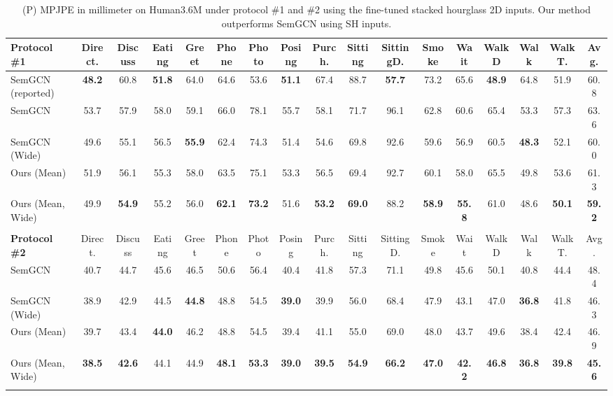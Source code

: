 \begin{table}
\scriptsize
\setlength{\tabcolsep}{1pt}
\begin{tabular}{lcccccccccccccccc}
\textbf{Protocol   \#1} & Direct. & Discuss & Eating & Greet & Phone & Photo & Posing & Purch. & Sitting & SittingD. & Smoke & Wait & WalkD & Walk & WalkT. & Avg. \\ \hline
SemGCN (reported)\cite{Zhao_2019_CVPR} & \textbf{48.2} & 60.8 & \textbf{51.8} & 64.0 & 64.6 & 53.6 & \textbf{51.1} & 67.4 & 88.7 & \textbf{57.7} & 73.2 & 65.6 & \textbf{48.9} & 64.8 & 51.9 & 60.8 \\
SemGCN & 53.7 & 57.9 & 58.0 & 59.1 & 66.0 & 78.1 & 55.7 & 58.1 & 71.7 & 96.1 & 62.8 & 60.6 & 65.4 & 53.3 & 57.3 & 63.6 \\
SemGCN (Wide) & 49.6 & 55.1 & 56.5 & \textbf{55.9} & 62.4 & 74.3 & 51.4 & 54.6 & 69.8 & 92.6 & 59.6 & 56.9 & 60.5 & \textbf{48.3} & 52.1 & 60.0 \\
Ours (Mean) & 51.9 & 56.1 & 55.3 & 58.0 & 63.5 & 75.1 & 53.3 & 56.5 & 69.4 & 92.7 & 60.1 & 58.0 & 65.5 & 49.8 & 53.6 & 61.3 \\
Ours (Mean, Wide) & 49.9 & \textbf{54.9} & 55.2 & 56.0 & \textbf{62.1} & \textbf{73.2} & 51.6 & \textbf{53.2} & \textbf{69.0} & 88.2 & \textbf{58.9} & \textbf{55.8} & 61.0 & 48.6 & \textbf{50.1} & \textbf{59.2} \\
 &  &  &  &  &  &  &  &  &  &  &  &  &  &  &  &  \\
\textbf{Protocol \#2} & Direct. & Discuss & Eating & Greet & Phone & Photo & Posing & Purch. & Sitting & SittingD. & Smoke & Wait & WalkD & Walk & WalkT. & Avg. \\ \hline
SemGCN & 40.7 & 44.7 & 45.6 & 46.5 & 50.6 & 56.4 & 40.4 & 41.8 & 57.3 & 71.1 & 49.8 & 45.6 & 50.1 & 40.8 & 44.4 & 48.4 \\
SemGCN (Wide) & 38.9 & 42.9 & 44.5 & \textbf{44.8} & 48.8 & 54.5 & \textbf{39.0} & 39.9 & 56.0 & 68.4 & 47.9 & 43.1 & 47.0 & \textbf{36.8} & 41.8 & 46.3 \\
Ours (Mean) & 39.7 & 43.4 & \textbf{44.0} & 46.2 & 48.8 & 54.5 & 39.4 & 41.1 & 55.0 & 69.0 & 48.0 & 43.7 & 49.6 & 38.4 & 42.4 & 46.9 \\
Ours (Mean, Wide) & \textbf{38.5} & \textbf{42.6} & 44.1 & 44.9 & \textbf{48.1} & \textbf{53.3} & \textbf{39.0} & \textbf{39.5} & \textbf{54.9} & \textbf{66.2} & \textbf{47.0} & \textbf{42.2} & \textbf{46.8} & \textbf{36.8} & \textbf{39.8} & \textbf{45.6} \\
 &  &  &  &  &  &  &  &  &  &  &  &  &  &  &  & 
\end{tabular}
\label{tab:SH_ours_semgcn}
\caption{(P) MPJPE in millimeter on Human3.6M under protocol \#1 and \#2 using the fine-tuned stacked hourglass 2D inputs. Our method outperforms SemGCN using SH inputs.}
\end{table}

